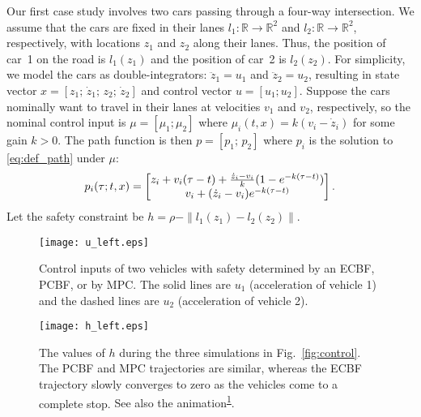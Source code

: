 \documentclass[10pt,conference]{ieeeconf}
\renewcommand{\(}{\left(}
\renewcommand{\)}{\right)}
\renewcommand{\[}{\left[}
\renewcommand{\]}{\right]}
\newcommand{\reals}{\mathbb{R}}
\newcommand{\regularversion}[1]{\iffalse{}#1\fi}
\newcommand{\extendedversion}[1]{{\color{black}#1}}
\begin{document}
Our first case study involves two cars passing through a four-way intersection. We assume that the cars are fixed in their lanes $l_1:\reals\rightarrow\reals^2$ and $l_2:\reals\rightarrow\reals^2$, respectively, with locations $z_1$ and $z_2$ along their lanes. Thus, the position of car~1 on the road is $l_1(z_1)$ and the position of car~2 is $l_2(z_2)$. For simplicity, we model the cars as double-integrators: $\ddot{z}_1 = u_1$ and $\ddot{z}_2 = u_2$, resulting in state vector $x = [z_1;\, \dot{z}_1;\, z_2;\, \dot{z}_2]$ and control vector $u = [u_1; u_2]$. Suppose the cars nominally want to travel in their lanes at velocities $v_1$ and $v_2$, respectively, so the nominal control input is $\mu = [\mu_1; \mu_2]$ where $\mu_i(t,x) = k(v_i - \dot{z}_i)$ for some gain $k > 0$. The path function is then $p = [p_1;\,p_2]$ where $p_i$ is the solution to \eqref{eq:def_path} under $\mu$:
\begin{equation}
    \hspace{-4pt} p_i(\tau;t,x) = \begin{bmatrix} z_i + v_i(\tau - t) + \frac{\dot{z}_i - v_i}{k}(1 - e^{-k(\tau - t)}) \\ v_i + (\dot{z}_i - v_i)e^{-k(\tau-t)} \end{bmatrix}. \hspace{-4pt}
\end{equation}
Let the safety constraint be $h = \rho - \|l_1(z_1) - l_2(z_2)\|$.

\begin{figure}
    \centering
    \texttt{[image: u\_left.eps]}
    \caption{Control inputs of two vehicles with safety determined by an ECBF, PCBF, or by MPC. The solid lines are $u_1$ (acceleration of vehicle 1) and the dashed lines are $u_2$ (acceleration of vehicle 2).}
    \label{fig:control}
\regularversion{\vspace{10pt}}\extendedversion{\vspace{7pt}}
    \centering
    \texttt{[image: h\_left.eps]}
    \caption{The values of $h$ during the three simulations in Fig.~\ref{fig:control}. The PCBF and MPC trajectories are similar, whereas the ECBF trajectory slowly converges to zero as the vehicles come to a complete stop. {See also the animation\textsuperscript{\protect\hyperlink{note:car}{1}}.}}
    \label{fig:safety}
    \vspace{-12pt}
\end{figure}
\end{document}
